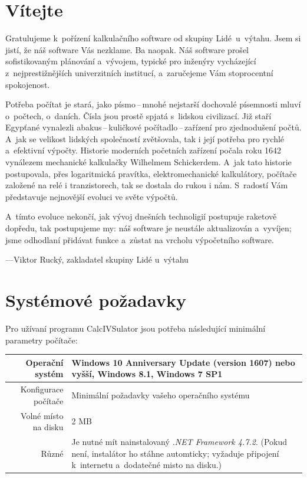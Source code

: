 \documentclass[a5paper,8pt,twoside]{extarticle}
\begin{document}
    \newpage
    \setcounter{page}{1}
    \tableofcontents
    
    \newpage

    \section*{Vítejte}
    Gratulujeme k~pořízení kalkulačního software od skupiny Lidé~u~výtahu. Jsem si jistí, že náš software Vás nezklame. Ba naopak. Náš software prošel sofistikovaným plánování a~vývojem, typické pro inženýry vycházející z~nejprestižnějších univerzitních institucí, a~zaručejeme Vám stoprocentní spokojenost.

    Potřeba počítat je stará, jako písmo\,--\,mnohé nejstarší dochovalé písemnosti mluví o~počtech, o~daních. Čísla jsou prostě spjatá s~lidskou civilizací. Již staří Egypťané vynalezli abakus\,--\,kuličkové počítadlo\,--\,zařízení pro zjednodušení počtů. A~jak se velikost lidských společností zvětšovala, tak i její potřeba pro rychlé a~efektivní výpočty. Historie moderních početních zařízení počala roku 1642 vynálezem mechanické kalkulačky Wilhelmem Schickerdem. A~jak tato historie postupovala, přes logaritmická pravítka, elektromechanické kalkulátory, počítače založené na relé i tranzistorech, tak se dostala do rukou i nám. S~radostí Vám představuje nejnovější evoluci ve světe výpočtů.

    A~tímto evoluce nekončí, jak vývoj dnešních technoligií postupuje raketově dopředu, tak postupujeme my: náš software je neustále aktualizován a~vyvíjen; jsme odhodlaní přidávat funkce a~zůstat na vrcholu výpočetního software.
    
    ---Viktor Rucký, zakladatel skupiny Lidé u~výtahu
    \newpage
    \section{Systémové požadavky}
    Pro užívaní programu CalcIVSulator jsou potřeba následující minimální parametry počítače:
    \begin{table}[h]
        \begin{tabularx}{\textwidth}{|r|X|}
        \hline
        Operační systém & Windows 10 Anniversary Update
        (version 1607) nebo vyšší, Windows 8.1, Windows 7 SP1 \\ \hline
        Konfigurace počítače & Minimální požadavky vašeho operačního systému \\ \hline
        Volné místo na disku & 2 MB \\ \hline
        Různé & Je nutné mít nainstalovaný \emph{.NET Framework 4.7.2}. (Pokud není, instalátor ho stáhne automticky; vyžaduje připojení k~internetu a~dodatečné misto na disku.) \\ \hline
        \end{tabularx}
        \end{table}
\end{document}
